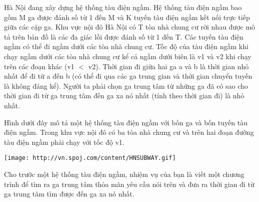 Hà Nội đang xây dựng hệ thống tàu điện ngầm. Hệ thống tàu điện ngầm bao gồm M ga được đánh số từ 1 đến M và K tuyến tàu điện ngầm kết nối trực tiếp giữa các cặp ga. Khu vực nội đô Hà Nội có T tòa nhà chung cư rời nhau được mô tả trên bản đồ là các đa giác lồi được đánh số từ 1 đến T. Các tuyến tàu điện ngầm có thể đi ngầm dưới các tòa nhà chung cư.  Tốc độ của tàu điện ngầm khi chạy ngầm dưới các tòa nhà chung cư kể cả ngầm dưới biên là v1 và v2 khi chạy trên các đoạn khác (v1 $<$ v2). Thời gian đi giữa hai ga a và b là thời gian nhỏ nhất để đi từ a đến b (có thể đi qua các ga trung gian và thời gian chuyển tuyến là không đáng kể). Người ta phải chọn ga trung tâm từ những ga đã có sao cho thời gian đi từ ga trung tâm đến ga xa nó nhất (tính theo thời gian đi) là nhỏ nhất.  

   Hình dưới đây mô tả một hệ thống tàu điện ngầm với bốn ga và bốn tuyến tàu điện ngầm. Trong khu vực nội đô có ba tòa nhà chung cư và trên hai đoạn đường tàu điện ngầm phải chạy với tốc độ v1.  


\texttt{[image: http://vn.spoj.com/content/HNSUBWAY.gif]}

   Cho trước một hệ thống tàu điện ngầm, nhiệm vụ của bạn là viết một chương trình để tìm ra ga trung tâm thỏa mãn yêu cầu nói trên và đưa ra thời gian đi từ ga trung tâm tìm được đến ga xa nó nhất.  

\